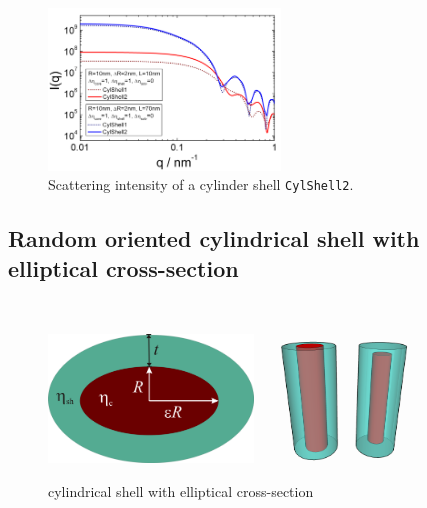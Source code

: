\begin{figure}[htb]
\begin{center}
\includegraphics[width=0.55\textwidth]{../images/form_factor/cylindrical_obj/CylShell2IQ.png}
\end{center}
\caption{Scattering intensity of a cylinder shell \texttt{CylShell2}.}
\label{fig:CylShell2}
\end{figure}



\clearpage
\subsection{Random oriented cylindrical shell with elliptical cross-section}
\label{sect:random_ellCylinderShell}
~\\

\begin{figure}[htb]
\begin{center}
\includegraphics[width=0.4866\textwidth]{../images/form_factor/cylindrical_obj/ellCylShell_shape.png}
\hspace{0.0\textwidth}
\includegraphics[width=0.4\textwidth]{../images/form_factor/cylindrical_obj/CylShell.png}
\end{center}
\caption{cylindrical shell with elliptical cross-section}
\label{fig:ellCylShell}
\end{figure}

